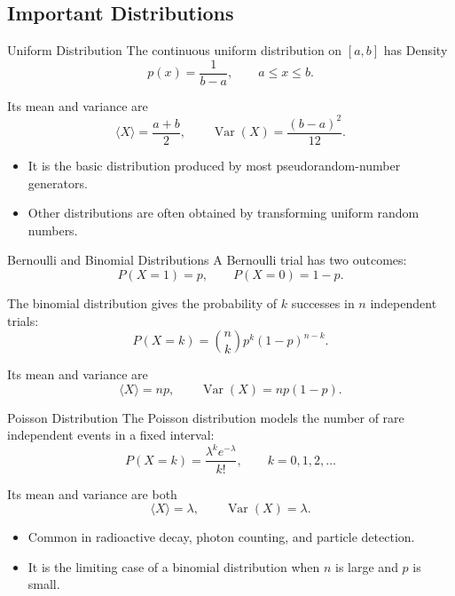 \documentclass[a4paper, 10pt, onepage]{elegantbook}
\begin{document}
{\subsection{Important Distributions}

\begin{frame}{Uniform Distribution}
  The continuous uniform distribution on \([a,b]\) has Density
  \[
    p(x)=\frac{1}{b-a},
    \qquad a\le x\le b.
  \]

  Its mean and variance are
  \[
    \langle X\rangle=\frac{a+b}{2},
    \qquad
    \operatorname{Var}(X)=\frac{(b-a)^2}{12}.
  \]

  \begin{itemize}
    \item It is the basic distribution produced by most pseudorandom-number generators.
    \item Other distributions are often obtained by transforming uniform random numbers.
  \end{itemize}
\end{frame}

\begin{frame}{Bernoulli and Binomial Distributions}
  A Bernoulli trial has two outcomes:
  \[
    P(X=1)=p,
    \qquad
    P(X=0)=1-p.
  \]

  The binomial distribution gives the probability of \(k\) successes in \(n\) independent trials:
  \[
    P(X=k)
    =
    \binom{n}{k}p^k(1-p)^{n-k}.
  \]

  Its mean and variance are
  \[
    \langle X\rangle=np,
    \qquad
    \operatorname{Var}(X)=np(1-p).
  \]
\end{frame}

\begin{frame}{Poisson Distribution}
  The Poisson distribution models the number of rare independent events in a fixed interval:
  \[
    P(X=k)
    =
    \frac{\lambda^k e^{-\lambda}}{k!},
    \qquad k=0,1,2,\ldots
  \]

  Its mean and variance are both
  \[
    \langle X\rangle=\lambda,
    \qquad
    \operatorname{Var}(X)=\lambda.
  \]

  \begin{itemize}
    \item Common in radioactive decay, photon counting, and particle detection.
    \item It is the limiting case of a binomial distribution when \(n\) is large and \(p\) is small.
  \end{itemize}
\end{frame}

}
\end{document}
